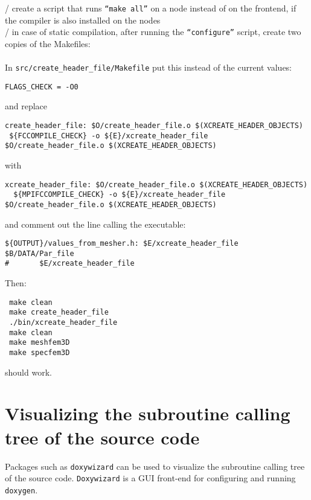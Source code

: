 / create a script that runs \texttt{``make all''} on a node instead of on the frontend, if the compiler is also installed on the nodes \\

/ in case of static compilation, after running the \texttt{``configure''} script, create two copies of the Makefiles:
\\
\\

\noindent
In \texttt{src/create\_header\_file/Makefile} put this instead of the current values:
{\small
\begin{verbatim}
FLAGS_CHECK = -O0
\end{verbatim}
}
\noindent
and replace
{\small
\begin{verbatim}
create_header_file: $O/create_header_file.o $(XCREATE_HEADER_OBJECTS)
 ${FCCOMPILE_CHECK} -o ${E}/xcreate_header_file $O/create_header_file.o $(XCREATE_HEADER_OBJECTS)
\end{verbatim}
}
\noindent
with
{\small
\begin{verbatim}
xcreate_header_file: $O/create_header_file.o $(XCREATE_HEADER_OBJECTS)
  ${MPIFCCOMPILE_CHECK} -o ${E}/xcreate_header_file $O/create_header_file.o $(XCREATE_HEADER_OBJECTS)
\end{verbatim}
}
\noindent
and comment out the line calling the executable:
{\small
\begin{verbatim}
${OUTPUT}/values_from_mesher.h: $E/xcreate_header_file $B/DATA/Par_file
#       $E/xcreate_header_file
\end{verbatim}
}
\noindent
Then:
{\small
\begin{verbatim}
 make clean
 make create_header_file
 ./bin/xcreate_header_file
 make clean
 make meshfem3D
 make specfem3D
\end{verbatim}
}
\noindent
should work.


\section{Visualizing the subroutine calling tree of the source code}

Packages such as \texttt{doxywizard} can be used to visualize the subroutine calling tree of the source code.
\texttt{Doxywizard} is a GUI front-end for configuring and running \texttt{doxygen}.

